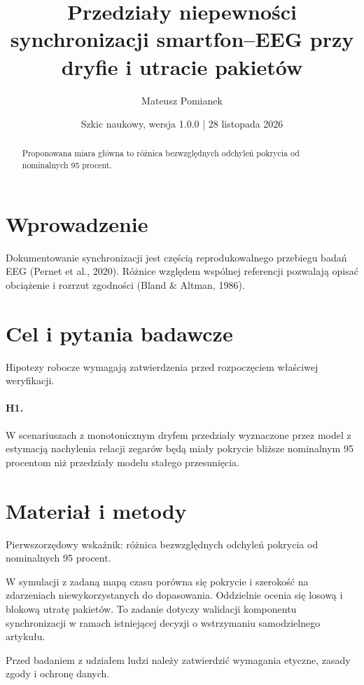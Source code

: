\documentclass[11pt,a4paper]{article}
\title{Przedziały niepewności synchronizacji smartfon--EEG przy dryfie i utracie pakietów}
\author{Mateusz Pomianek}
\date{Szkic naukowy, wersja 1.0.0 | 28 listopada 2026}
\begin{document}
\maketitle

\begin{abstract}

Proponowana miara główna to różnica bezwzględnych odchyleń pokrycia od nominalnych 95 procent.

\end{abstract}

\section{Wprowadzenie}

Dokumentowanie synchronizacji jest częścią reprodukowalnego przebiegu badań EEG (Pernet et al., 2020). Różnice względem wspólnej referencji pozwalają opisać obciążenie i rozrzut zgodności (Bland \& Altman, 1986).

\section{Cel i pytania badawcze}

Hipotezy robocze wymagają zatwierdzenia przed rozpoczęciem właściwej weryfikacji.

\paragraph{H1.} W scenariuszach z monotonicznym dryfem przedziały wyznaczone przez model z estymacją nachylenia relacji zegarów będą miały pokrycie bliższe nominalnym 95 procentom niż przedziały modelu stałego przesunięcia.

\section{Materiał i metody}

Pierwszorzędowy wskaźnik: różnica bezwzględnych odchyleń pokrycia od nominalnych 95 procent.

W symulacji z zadaną mapą czasu porówna się pokrycie i szerokość na zdarzeniach niewykorzystanych do dopasowania. Oddzielnie ocenia się losową i blokową utratę pakietów. To zadanie dotyczy walidacji komponentu synchronizacji w ramach istniejącej decyzji o wstrzymaniu samodzielnego artykułu.

Przed badaniem z udziałem ludzi należy zatwierdzić wymagania etyczne, zasady zgody i ochronę danych.
\end{document}
